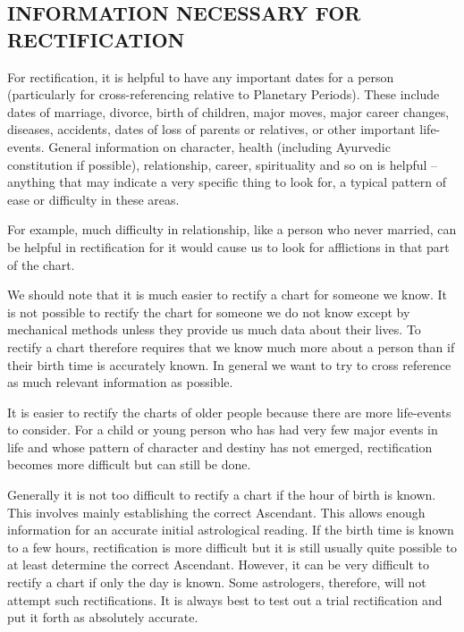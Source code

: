  

\subsection{INFORMATION NECESSARY FOR RECTIFICATION}

 

For rectification, it is helpful to have any important dates for a person (particularly for cross-referencing relative to Planetary Periods). These include dates of marriage, divorce, birth of children, major moves, major career changes, diseases, accidents, dates of loss of parents or relatives, or other important life-events.
General information on character, health (including Ayurvedic constitution if possible), relationship, career, spirituality and so on is helpful – anything that may indicate a very specific thing to look for, a typical pattern of ease or difficulty in these areas.
 

For example, much difficulty in relationship, like a person who never married, can be helpful in rectification for it would cause us to look for afflictions in that part of the chart.

 

We should note that it is much easier to rectify a chart for someone we know. It is not possible to rectify the chart for someone we do not know except by mechanical methods unless they provide us much data about their lives. To rectify a chart therefore requires that we know much more about a person than if their birth time is accurately known. In general we want to try to cross reference as much relevant information as possible.

 

It is easier to rectify the charts of older people because there are more life-events to consider. For a child or young person who has had very few major events in life and whose pattern of character and destiny has not emerged, rectification becomes more difficult but can still be done.

 

Generally it is not too difficult to rectify a chart if the hour of birth is known. This involves mainly establishing the correct Ascendant. This allows enough information  for an accurate initial astrological reading. If the birth time is known to a few hours, rectification is more difficult but it is still usually quite possible to at least determine the correct Ascendant. However, it can be very difficult to rectify a chart if only the day is known. Some astrologers, therefore, will not attempt such rectifications. It is always best to test out a trial rectification and put it forth as absolutely accurate.

